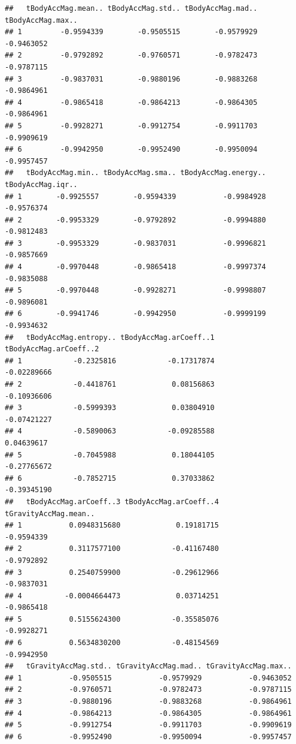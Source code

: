 \documentclass[
]{article}
\begin{document}
\begin{verbatim}
##   tBodyAccMag.mean.. tBodyAccMag.std.. tBodyAccMag.mad.. tBodyAccMag.max..
## 1         -0.9594339        -0.9505515        -0.9579929        -0.9463052
## 2         -0.9792892        -0.9760571        -0.9782473        -0.9787115
## 3         -0.9837031        -0.9880196        -0.9883268        -0.9864961
## 4         -0.9865418        -0.9864213        -0.9864305        -0.9864961
## 5         -0.9928271        -0.9912754        -0.9911703        -0.9909619
## 6         -0.9942950        -0.9952490        -0.9950094        -0.9957457
##   tBodyAccMag.min.. tBodyAccMag.sma.. tBodyAccMag.energy.. tBodyAccMag.iqr..
## 1        -0.9925557        -0.9594339           -0.9984928        -0.9576374
## 2        -0.9953329        -0.9792892           -0.9994880        -0.9812483
## 3        -0.9953329        -0.9837031           -0.9996821        -0.9857669
## 4        -0.9970448        -0.9865418           -0.9997374        -0.9835088
## 5        -0.9970448        -0.9928271           -0.9998807        -0.9896081
## 6        -0.9941746        -0.9942950           -0.9999199        -0.9934632
##   tBodyAccMag.entropy.. tBodyAccMag.arCoeff..1 tBodyAccMag.arCoeff..2
## 1            -0.2325816            -0.17317874            -0.02289666
## 2            -0.4418761             0.08156863            -0.10936606
## 3            -0.5999393             0.03804910            -0.07421227
## 4            -0.5890063            -0.09285588             0.04639617
## 5            -0.7045988             0.18044105            -0.27765672
## 6            -0.7852715             0.37033862            -0.39345190
##   tBodyAccMag.arCoeff..3 tBodyAccMag.arCoeff..4 tGravityAccMag.mean..
## 1           0.0948315680             0.19181715            -0.9594339
## 2           0.3117577100            -0.41167480            -0.9792892
## 3           0.2540759900            -0.29612966            -0.9837031
## 4          -0.0004664473             0.03714251            -0.9865418
## 5           0.5155624300            -0.35585076            -0.9928271
## 6           0.5634830200            -0.48154569            -0.9942950
##   tGravityAccMag.std.. tGravityAccMag.mad.. tGravityAccMag.max..
## 1           -0.9505515           -0.9579929           -0.9463052
## 2           -0.9760571           -0.9782473           -0.9787115
## 3           -0.9880196           -0.9883268           -0.9864961
## 4           -0.9864213           -0.9864305           -0.9864961
## 5           -0.9912754           -0.9911703           -0.9909619
## 6           -0.9952490           -0.9950094           -0.9957457

\end{verbatim}
\end{document}
